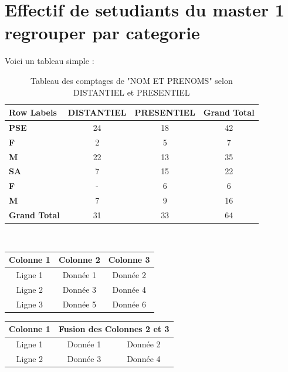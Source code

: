 \documentclass[a4paper,12pt]{article} %
\begin{document}
\section{Effectif de setudiants du master 1 regrouper par categorie}
Voici un tableau simple :

\begin{table}[ht]
\centering
\begin{tabular}{|l|c|c|c|}
\hline
\textbf{Row Labels} & \textbf{DISTANTIEL} & \textbf{PRESENTIEL} & \textbf{Grand Total} \\
\hline
\textbf{PSE}        & 24                 & 18                 & 42                  \\
\hline
\textbf{F}          & 2                  & 5                  & 7                   \\
\hline
\textbf{M}          & 22                 & 13                 & 35                  \\
\hline
\textbf{SA}         & 7                  & 15                 & 22                  \\
\hline
\textbf{F}          & -                  & 6                  & 6                   \\
\hline
\textbf{M}          & 7                  & 9                  & 16                  \\
\hline
\textbf{Grand Total} & 31                 & 33                 & 64                  \\
\hline
\end{tabular} \\
\caption{Tableau des comptages de "NOM ET PRENOMS" selon DISTANTIEL et PRESENTIEL}
\end{table}


\begin{tabular}{|c|c|c|}
\hline
Colonne 1 & Colonne 2 & Colonne 3 \\ %
\hline
Ligne 1 & Donnée 1 & Donnée 2 \\ %
\hline
Ligne 2 & Donnée 3 & Donnée 4 \\ %
\hline
Ligne 3 & Donnée 5 & Donnée 6 \\ %
\hline
\end{tabular}

\vspace{1cm} %

\begin{tabular}{|c|c|c|}
\hline
Colonne 1 & \multicolumn{2}{c|}{Fusion des Colonnes 2 et 3} \\ %
\hline
Ligne 1 & Donnée 1 & Donnée 2 \\
\hline
Ligne 2 & Donnée 3 & Donnée 4 \\
\hline
\end{tabular}
\end{document}
